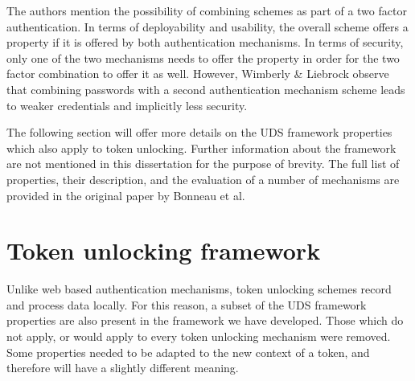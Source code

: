 The authors mention the possibility of combining schemes as part of a two factor authentication. In terms of deployability and usability, the overall scheme offers a property if it is offered by both authentication mechanisms. In terms of security, only one of the two mechanisms needs to offer the property in order for the two factor combination to offer it as well. However, Wimberly \& Liebrock \cite{wimberly2011using} observe that combining passwords with a second authentication mechanism scheme leads to weaker credentials and implicitly less security.

The following section will offer more details on the UDS framework properties which also apply to token unlocking. Further information about the framework are not mentioned in this dissertation for the purpose of brevity.  The full list of properties, their description, and the evaluation of a number of mechanisms are provided in the original paper by Bonneau et al. 

\section{Token unlocking framework}
\label{tokenframework}
Unlike web based authentication mechanisms, token unlocking schemes record and process data locally. For this reason, a subset of the UDS framework properties are also present in the framework we have developed. Those which do not apply, or would apply to every token unlocking mechanism were removed. Some properties needed to be adapted to the new context of a token, and therefore will have a slightly different meaning.

